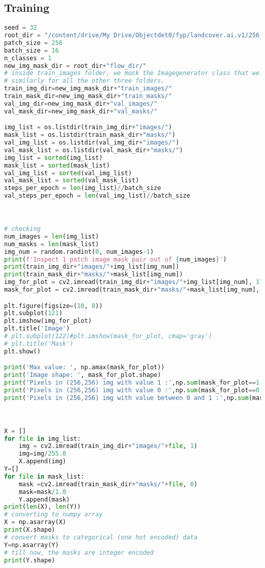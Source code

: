 \subsection{Training}
\begin{lstlisting}[language=Python]
seed = 32
root_dir = "/content/drive/My Drive/Objectdet0/fyp/landcover.ai.v1/256_patches/"
patch_size = 256
batch_size = 16
n_classes = 1
new_img_mask_dir = root_dir+"flow_dir/"
# inside train_images folder, we mock the Imagegenerator class that we have 1 class called "images" 
# similarly for all the other three folders.
train_img_dir=new_img_mask_dir+"train_images/"
train_mask_dir=new_img_mask_dir+"train_masks/"
val_img_dir=new_img_mask_dir+"val_images/"
val_mask_dir=new_img_mask_dir+"val_masks/"

img_list = os.listdir(train_img_dir+"images/")
mask_list = os.listdir(train_mask_dir+"masks/")
val_img_list = os.listdir(val_img_dir+"images/")
val_mask_list = os.listdir(val_mask_dir+"masks/")
img_list = sorted(img_list)
mask_list = sorted(mask_list)
val_img_list = sorted(val_img_list)
val_mask_list = sorted(val_mask_list)
steps_per_epoch = len(img_list)//batch_size
val_steps_per_epoch = len(val_img_list)//batch_size



# checking
num_images = len(img_list)
num_masks = len(mask_list)
img_num = random.randint(0, num_images-1)
print(f'Inspect 1 patch image mask pair out of {num_images}')
print(train_img_dir+"images/"+img_list[img_num])
print(train_mask_dir+"masks/"+mask_list[img_num])
img_for_plot = cv2.imread(train_img_dir+"images/"+img_list[img_num], 1)
mask_for_plot = cv2.imread(train_mask_dir+"masks/"+mask_list[img_num], 0)

plt.figure(figsize=(10, 8))
plt.subplot(121)
plt.imshow(img_for_plot)
plt.title('Image')
# plt.subplot(122)#plt.imshow(mask_for_plot, cmap='gray')
# plt.title('Mask')
plt.show()

print('Max value: ', np.amax(mask_for_plot))
print('Image shape: ', mask_for_plot.shape)
print('Pixels in (256,256) img with value 1 :',np.sum(mask_for_plot==1.0))
print('Pixels in (256,256) img with value 0 :',np.sum(mask_for_plot==0.0))
print('Pixels in (256,256) img with value between 0 and 1 :',np.sum(mask_for_plot>0.0)-np.sum(mask_for_plot==1.0))



X = []
for file in img_list:
    img = cv2.imread(train_img_dir+"images/"+file, 1)
    img=img/255.0
    X.append(img)
Y=[]
for file in mask_list:
    mask =cv2.imread(train_mask_dir+"masks/"+file, 0)
    mask=mask/1.0
    Y.append(mask)
print(len(X), len(Y))
# converting to numpy array
X = np.asarray(X)
print(X.shape)
# convert masks to categorical (one hot encoded) data
Y=np.asarray(Y)
# till now, the masks are integer encoded
print(Y.shape)




\end{lstlisting}
